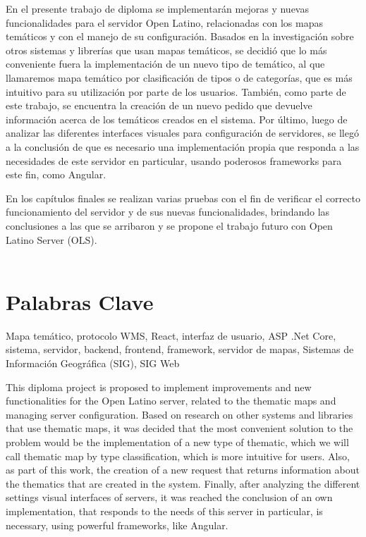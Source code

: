 
En el presente trabajo de diploma se implementar\'an mejoras y nuevas funcionalidades para el servidor Open Latino, relacionadas con los mapas tem\'aticos y con el manejo de su configuraci\'on. Basados en la investigaci\'on sobre otros sistemas y librer\'ias que usan mapas tem\'aticos, se decidi\'o que lo m\'as conveniente fuera la implementaci\'on de un nuevo tipo de tem\'atico, al que llamaremos mapa tem\'atico por clasificaci\'on de tipos o de categor\'ias, que es m\'as intuitivo para su utilizaci\'on por parte de los usuarios. Tambi\'en, como parte de este trabajo, se encuentra la creaci\'on de un nuevo pedido que devuelve informaci\'on acerca de los tem\'aticos creados en el sistema. Por \'ultimo, luego de analizar las diferentes interfaces visuales para configuraci\'on de servidores, se lleg\'o a la conclusi\'on de que es necesario una implementaci\'on propia que responda a las necesidades de este servidor en particular, usando poderosos frameworks para este fin, como Angular.

En los cap\'itulos finales se realizan varias pruebas con el fin de verificar el correcto funcionamiento del servidor y de sus nuevas funcionalidades, brindando las conclusiones a las que se arribaron y se propone el trabajo futuro con Open Latino Server (OLS).\\\\

\section*{Palabras Clave}
Mapa tem\'atico, protocolo WMS, React, interfaz de usuario, ASP .Net Core, sistema, servidor, backend, frontend, framework, servidor de mapas, Sistemas de Informaci\'on Geogr\'afica (SIG), SIG Web


This diploma project is proposed to implement improvements and new functionalities for the Open Latino server, related to the thematic maps and managing server configuration. Based on research on other systems and libraries that use thematic maps, it was decided that the most convenient solution to the problem would be the implementation of a new type of thematic, which we will call thematic map by type classification, which is more intuitive for users. Also, as part of this work, the creation of a new request that returns information about the thematics that are created in the system. Finally, after analyzing the different settings visual interfaces of servers, it was reached the conclusion of an own implementation, that responds to the needs of this server in particular, is necessary, using powerful frameworks, like Angular. 

